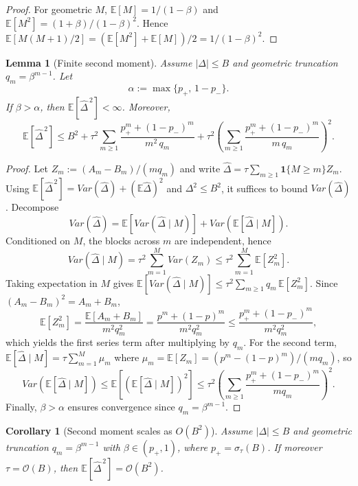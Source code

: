 \documentclass[11pt]{article}
\theoremstyle{plain}
\newtheorem{lemma}[theorem]{Lemma}
\newtheorem{corollary}[theorem]{Corollary}
\theoremstyle{remark}
\newcommand{\E}{\mathbb{E}}
\newcommand{\Var}{Var}
\newcommand{\1}{\mathbf{1}}
\begin{document}
\begin{proof}
For geometric $M$, $\E[M]=1/(1-\beta)$ and $\E[M^2]=(1+\beta)/(1-\beta)^2$. Hence
$\E[M(M+1)/2]=(\E[M^2]+\E[M])/2=1/(1-\beta)^2$.
\end{proof}

\begin{propbox}
\begin{lemma}[Finite second moment]\label{lem:second}
Assume $|\Delta|\le B$ and geometric truncation $q_m=\beta^{m-1}$. Let
\[
\alpha:=\max\{p_+,\,1-p_-\}.
\]
If $\beta>\alpha$, then $\E[\widehat\Delta^{\,2}]<\infty$. Moreover,
\[
\E[\widehat\Delta^{\,2}]
\le
B^2
+
\tau^2 \sum_{m\ge1}\frac{p_+^m+(1-p_-)^m}{m^2\,q_m}
+
\tau^2\left(\sum_{m\ge1}\frac{p_+^m+(1-p_-)^m}{m\,q_m}\right)^2.
\]
\end{lemma}
\end{propbox}

\begin{proof}
Let $Z_m:=(A_m-B_m)/(m q_m)$ and write $\widehat\Delta=\tau\sum_{m\ge1}\1\{M\ge m\}Z_m$.
Using $\E[\widehat\Delta^{\,2}]=\Var(\widehat\Delta)+(\E\widehat\Delta)^2$ and $\Delta^2\le B^2$, it suffices to bound
$\Var(\widehat\Delta)$. Decompose
\[
\Var(\widehat\Delta)
=
\E[\Var(\widehat\Delta\mid M)]
+
\Var(\E[\widehat\Delta\mid M]).
\]
Conditioned on $M$, the blocks across $m$ are independent, hence
\[
\Var(\widehat\Delta\mid M)
=
\tau^2\sum_{m=1}^{M}\Var(Z_m)
\le
\tau^2\sum_{m=1}^{M}\E[Z_m^2].
\]
Taking expectation in $M$ gives
$
\E[\Var(\widehat\Delta\mid M)]
\le
\tau^2\sum_{m\ge1} q_m\,\E[Z_m^2].
$
Since $(A_m-B_m)^2=A_m+B_m$,
\[
\E[Z_m^2]
=
\frac{\E[A_m+B_m]}{m^2 q_m^2}
=
\frac{p^m+(1-p)^m}{m^2 q_m^2}
\le
\frac{p_+^m+(1-p_-)^m}{m^2 q_m^2},
\]
which yields the first series term after multiplying by $q_m$.
For the second term, $\E[\widehat\Delta\mid M]=\tau\sum_{m=1}^{M}\mu_m$ where
$\mu_m=\E[Z_m]=(p^m-(1-p)^m)/(m q_m)$, so
\[
\Var(\E[\widehat\Delta\mid M])
\le
\E[(\E[\widehat\Delta\mid M])^2]
\le
\tau^2\left(\sum_{m\ge1}\frac{p_+^m+(1-p_-)^m}{m q_m}\right)^2.
\]
Finally, $\beta>\alpha$ ensures convergence since $q_m=\beta^{m-1}$.
\end{proof}





\begin{propbox}
\begin{corollary}[Second moment scales as $O(B^2)$]\label{cor:momentB}
Assume $|\Delta|\le B$ and geometric truncation $q_m=\beta^{m-1}$ with $\beta\in(p_+,1)$, where $p_+=\sigma_\tau(B)$.
If moreover $\tau=\mathcal{O}(B)$, then $\E[\widehat\Delta^{\,2}]=\mathcal{O}(B^2)$.
\end{corollary}
\end{propbox}
\end{document}
